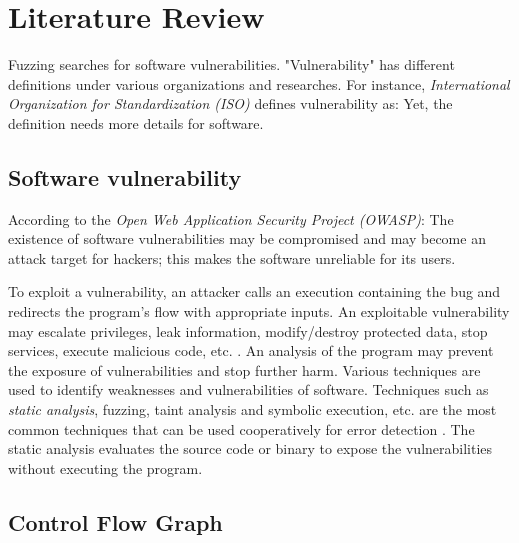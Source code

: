 \section{Literature Review} \label{sec:2-lit}

Fuzzing searches for software vulnerabilities. "Vulnerability" has different definitions under various organizations and researches. For instance, \textit{International Organization for Standardization (ISO)} defines vulnerability as:  \cite{iso27008} Yet, the definition needs more details for software. 

\subsection{Software vulnerability}
\label{sec:2.2.1}

According to the \textit{Open Web Application Security Project (OWASP)}:  The existence of software vulnerabilities may be compromised and may become an attack target for hackers; this makes the software unreliable for its users.

To exploit a vulnerability, an attacker calls an execution containing the bug and redirects the program's flow with appropriate inputs. An exploitable vulnerability may escalate privileges, leak information, modify/destroy protected data, stop services, execute malicious code, etc. \cite{chang2011trend}. An analysis of the program may prevent the exposure of vulnerabilities and stop further harm. Various techniques are used to identify weaknesses and vulnerabilities of software. Techniques such as \textit{static analysis}, fuzzing, taint analysis and symbolic execution, etc. are the most common techniques that can be used cooperatively for error detection \cite{su2016vuldetection}. The static analysis evaluates the source code or binary to expose the vulnerabilities without executing the program.

\subsection{Control Flow Graph}

